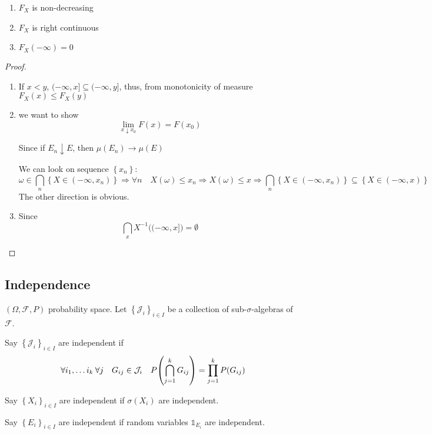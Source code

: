 \begin{prop}
\begin{enumerate}
	\item $F_X$ is non-decreasing
	\item $F_X$ is right continuous
	\item $F_X(-\infty) = 0$ 
\end{enumerate}
\begin{proof}
	
	\begin{enumerate}
		\item If $x<y$, $(-\infty, x] \subseteq (-\infty, y]$, thus, from monotonicity of measure $F_X(x)\leq F_X(y)$  
		\item we want to show
		$$\lim_{x\downarrow x_0} F(x) = F(x_0)$$
		
		Since if $E_n \downarrow E$, then $\mu(E_n) \to \mu(E)$
		
		We can look on sequence $\left\{ x_n\right\}$:
		$$\omega \in \bigcap_n \left\{ X \in (-\infty, x_n) \right\} \Rightarrow \forall n \quad X(\omega) \leq x_n \Rightarrow X(\omega) \leq x \Rightarrow \bigcap_n \left\{ X \in (-\infty, x_n) \right\} \subseteq \left\{ X \in (-\infty, x) \right\}$$
		The other direction is obvious.
		\item Since 
		$$\bigcap_x X^{-1}\big((-\infty,x]\big) = \emptyset$$
	\end{enumerate}
\end{proof}
\end{prop}

\subsection{Independence}
$(\Omega, \mathcal{F}, P)$ probability space.
Let $\left\{ \mathcal{J}_i \right\}_{i\in I}$ be a collection of sub-$\sigma$-algebras of $\mathcal{F}$.
\begin{definition}
	Say $\left\{ \mathcal{J}_i \right\}_{i\in I}$ are independent if
	$$\forall i_1, \dots i_k \: \forall j \quad G_{ij} \in  \mathcal{J}_i \quad P\qty(\bigcap_{j=1}^k G_{ij}) = \prod_{j=1}^k P(G_{ij})$$
\end{definition}
\begin{definition}
	Say $\left\{ X_i \right\}_{i\in I}$ are independent if $\sigma(X_i)$ are independent.
\end{definition}
\begin{definition}
Say $\left\{ E_i \right\}_{i\in I}$ are independent if random variables $\mathds{1}_{E_i}$ are independent.
\end{definition}
